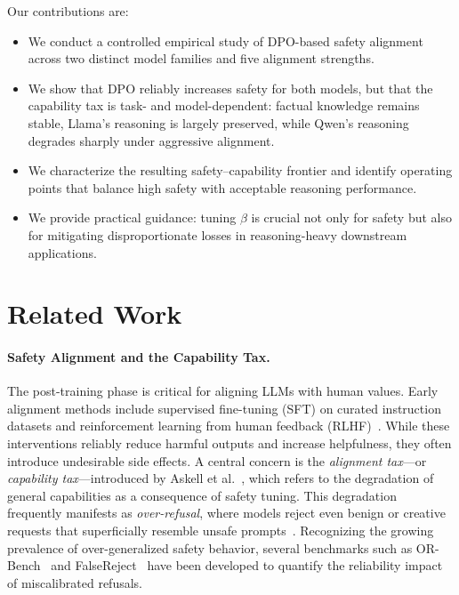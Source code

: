 \documentclass[a4paper, twocolumn, 9pt]{article}
\begin{document}
Our contributions are:
\begin{itemize}
    \item We conduct a controlled empirical study of DPO-based safety alignment across
          two distinct model families and five alignment strengths.
    \item We show that DPO reliably increases safety for both models, but that the
          capability tax is task- and model-dependent: factual knowledge
          remains stable, Llama's reasoning is largely preserved, while Qwen's
          reasoning degrades sharply under aggressive alignment.
    \item We characterize the resulting safety--capability frontier and identify
          operating points that balance high safety with acceptable reasoning
          performance.
    \item We provide practical guidance: tuning $\beta$ is crucial not only for
          safety but also for mitigating disproportionate losses in reasoning-heavy
          downstream applications.
\end{itemize}


\section{Related Work}

\paragraph{Safety Alignment and the Capability Tax.}
The post-training phase is critical for aligning LLMs with human values.
Early alignment methods include supervised fine-tuning (SFT) on curated
instruction datasets and reinforcement learning from human feedback (RLHF)~\cite{rlhf}.
While these interventions reliably reduce harmful outputs and increase helpfulness,
they often introduce undesirable side effects. A central concern is the
\emph{alignment tax}---or \emph{capability tax}---introduced by Askell et al.~\cite{askell2021alignment},
which refers to the degradation of general capabilities as a consequence of safety tuning.
This degradation frequently manifests as \emph{over-refusal}, where models reject even
benign or creative requests that superficially resemble unsafe prompts~\cite{llm-overrefusal}.
Recognizing the growing prevalence of over-generalized safety behavior, several benchmarks
such as OR-Bench~\cite{orbench} and FalseReject~\cite{falsereject} have been developed to
quantify the reliability impact of miscalibrated refusals.
\end{document}
